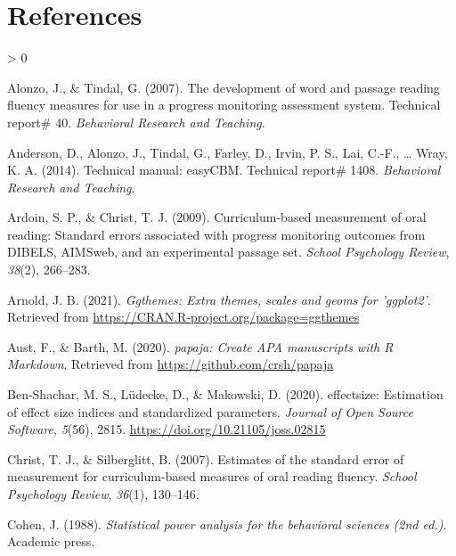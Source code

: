 \documentclass[
  english,
  man, fleqn, noextraspace]{apa6}
\newlength{\cslhangindent}
\newenvironment{CSLReferences}[2] %
 {%
  \setlength{\parindent}{0pt}
  \ifodd #1 \everypar{\setlength{\hangindent}{\cslhangindent}}\ignorespaces\fi
  \ifnum #2 > 0
  \setlength{\parskip}{#2\baselineskip}
  \fi
 }%
 {}
\begin{document}
\newpage

\hypertarget{references}{%
\section{References}\label{references}}

\begingroup
\setlength{\parindent}{-0.5in}
\setlength{\leftskip}{0.5in}

\hypertarget{refs}{}
\begin{CSLReferences}{1}{0}
\leavevmode\hypertarget{ref-alonzotindal2007}{}%
Alonzo, J., \& Tindal, G. (2007). The development of word and passage reading fluency measures for use in a progress monitoring assessment system. Technical report\# 40. \emph{Behavioral Research and Teaching}.

\leavevmode\hypertarget{ref-anderson2014tech}{}%
Anderson, D., Alonzo, J., Tindal, G., Farley, D., Irvin, P. S., Lai, C.-F., \ldots{} Wray, K. A. (2014). Technical manual: easyCBM. Technical report\# 1408. \emph{Behavioral Research and Teaching}.

\leavevmode\hypertarget{ref-ardoin2009}{}%
Ardoin, S. P., \& Christ, T. J. (2009). Curriculum-based measurement of oral reading: Standard errors associated with progress monitoring outcomes from DIBELS, AIMSweb, and an experimental passage set. \emph{School Psychology Review}, \emph{38}(2), 266--283.

\leavevmode\hypertarget{ref-R-ggthemes}{}%
Arnold, J. B. (2021). \emph{Ggthemes: Extra themes, scales and geoms for 'ggplot2'}. Retrieved from \url{https://CRAN.R-project.org/package=ggthemes}

\leavevmode\hypertarget{ref-R-papaja}{}%
Aust, F., \& Barth, M. (2020). \emph{{papaja}: {Create} {APA} manuscripts with {R Markdown}}. Retrieved from \url{https://github.com/crsh/papaja}

\leavevmode\hypertarget{ref-R-effectsize}{}%
Ben-Shachar, M. S., Lüdecke, D., \& Makowski, D. (2020). {e}ffectsize: Estimation of effect size indices and standardized parameters. \emph{Journal of Open Source Software}, \emph{5}(56), 2815. \url{https://doi.org/10.21105/joss.02815}

\leavevmode\hypertarget{ref-christ2007}{}%
Christ, T. J., \& Silberglitt, B. (2007). Estimates of the standard error of measurement for curriculum-based measures of oral reading fluency. \emph{School Psychology Review}, \emph{36}(1), 130--146.

\leavevmode\hypertarget{ref-cohen1988}{}%
Cohen, J. (1988). \emph{Statistical power analysis for the behavioral sciences (2nd ed.)}. Academic press.


\end{CSLReferences}
\end{document}
